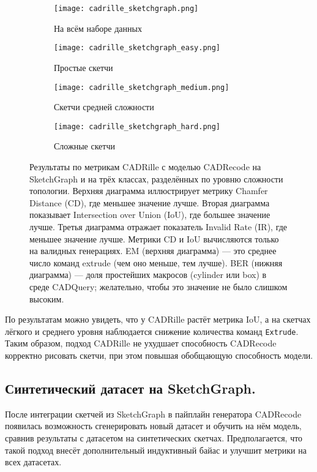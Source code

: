 \newpage
\begin{figure}[h!]
    \centering
    \begin{subfigure}{0.4\linewidth}
        \centering
        \texttt{[image: cadrille\_sketchgraph.png]}
        \caption{На всём наборе данных}
    \end{subfigure}
    \hfill
    \begin{subfigure}{0.4\linewidth}
        \centering
        \texttt{[image: cadrille\_sketchgraph\_easy.png]}
        \caption{Простые скетчи}
    \end{subfigure}

    \vspace{1em}

    \begin{subfigure}{0.4\linewidth}
        \centering
        \texttt{[image: cadrille\_sketchgraph\_medium.png]}
        \caption{Скетчи средней сложности}
    \end{subfigure}
    \hfill
    \begin{subfigure}{0.4\linewidth}
        \centering
        \texttt{[image: cadrille\_sketchgraph\_hard.png]}
        \caption{Сложные скетчи}
    \end{subfigure}

    \caption{Результаты по метрикам CADRille с моделью CADRecode на SketchGraph и на трёх классах, разделённых по уровню сложности топологии.
        Верхняя диаграмма иллюстрирует метрику Chamfer Distance (CD), где меньшее значение лучше.
        Вторая диаграмма показывает Intersection over Union (IoU), где большее значение лучше.
        Третья диаграмма отражает показатель Invalid Rate (IR), где меньшее значение лучше.
        Метрики CD и IoU вычисляются только на валидных генерациях.
        EM (верхняя диаграмма) — это среднее число команд extrude (чем оно меньше, тем лучше).
        BER (нижняя диаграмма) — доля простейших макросов (cylinder или box) в среде CADQuery; желательно, чтобы это значение не было слишком высоким.}
    \label{fig:exp4}
\end{figure}

По результатам можно увидеть, что у CADRille растёт метрика IoU, а на скетчах лёгкого и среднего уровня наблюдается снижение количества команд \texttt{Extrude}.
Таким образом, подход CADRille не ухудшает способность CADRecode корректно рисовать скетчи, при этом повышая обобщающую способность модели.

\subsection{Синтетический датасет на SketchGraph.}
После интеграции скетчей из SketchGraph в пайплайн генератора CADRecode появилась возможность сгенерировать новый датасет и обучить на нём модель, сравнив результаты с датасетом на синтетических скетчах. Предполагается, что такой подход внесёт дополнительный индуктивный байас и улучшит метрики на всех датасетах.

